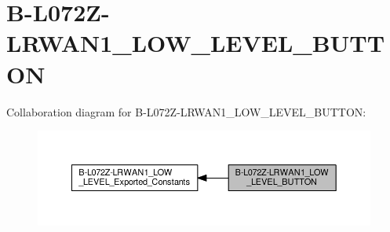 \hypertarget{group__B-L072Z-LRWAN1__LOW__LEVEL__BUTTON}{}\section{B-\/\+L072\+Z-\/\+L\+R\+W\+A\+N1\+\_\+\+L\+O\+W\+\_\+\+L\+E\+V\+E\+L\+\_\+\+B\+U\+T\+T\+ON}
\label{group__B-L072Z-LRWAN1__LOW__LEVEL__BUTTON}
Collaboration diagram for B-\/\+L072\+Z-\/\+L\+R\+W\+A\+N1\+\_\+\+L\+O\+W\+\_\+\+L\+E\+V\+E\+L\+\_\+\+B\+U\+T\+T\+ON\+:
\nopagebreak
\begin{figure}[H]
\begin{center}
\leavevmode
\includegraphics[width=350pt]{group__B-L072Z-LRWAN1__LOW__LEVEL__BUTTON}
\end{center}
\end{figure}
